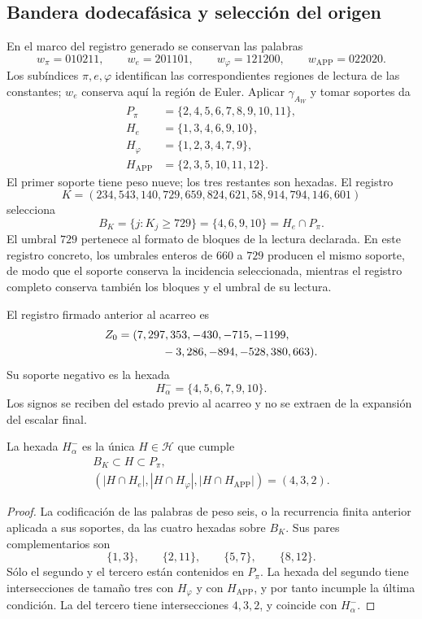 \subsection{Bandera dodecafásica y selección del origen}
\label{subsec:lf-flag}

En el marco del registro generado se conservan las palabras
\[
 w_\pi=010211,\qquad
 w_e=201101,\qquad
 w_\varphi=121200,\qquad
 w_{\mathrm{APP}}=022020.
\]
Los subíndices \(\pi,e,\varphi\) identifican las correspondientes
regiones de lectura de las constantes; \(w_e\) conserva aquí
la región de Euler. Aplicar \(\gamma_{A_W}\) y tomar soportes da
\[
\begin{aligned}
 P_\pi&=\{2,4,5,6,7,8,9,10,11\},\\
 H_e&=\{1,3,4,6,9,10\},\\
 H_\varphi&=\{1,2,3,4,7,9\},\\
 H_{\mathrm{APP}}&=\{2,3,5,10,11,12\}.
\end{aligned}
\]
El primer soporte tiene peso nueve; los tres restantes son
hexadas. El registro
\[
 K=(234,543,140,729,659,824,621,58,914,794,146,601)
\]
selecciona
\[
 B_K=\{j:K_j\geq729\}=\{4,6,9,10\}=H_e\cap P_\pi.
\]
El umbral \(729\) pertenece al formato de bloques de la
lectura declarada. En este registro concreto, los umbrales
enteros de \(660\) a \(729\) producen el mismo soporte, de
modo que el soporte conserva la incidencia seleccionada,
mientras el registro completo conserva también los bloques
y el umbral de su lectura.

El registro firmado anterior al acarreo es
\[
\begin{split}
 Z_0={}&(7,297,353,-430,-715,-1199,\\
       &\hspace{9mm}-3,286,-894,-528,380,663).
\end{split}
\]
Su soporte negativo es la hexada
\[
 H_\alpha^-=\{4,5,6,7,9,10\}.
\]
Los signos se reciben del estado previo al acarreo y no se
extraen de la expansión del escalar final.

\begin{proposition}
\label{prop:lf-flag}
La hexada \(H_\alpha^-\) es la única \(H\in\mathcal H\) que cumple
\[
\begin{gathered}
 B_K\subset H\subset P_\pi,\\
 (|H\cap H_e|,|H\cap H_\varphi|,
                   |H\cap H_{\mathrm{APP}}|)=(4,3,2).
\end{gathered}
\]
\end{proposition}
\begin{proof}
La codificación de las palabras de peso seis, o la recurrencia
finita anterior aplicada a sus soportes, da las cuatro
hexadas sobre \(B_K\). Sus pares complementarios son
\[
 \{1,3\},\qquad\{2,11\},\qquad\{5,7\},\qquad\{8,12\}.
\]
Sólo el segundo y el tercero están contenidos en \(P_\pi\).
La hexada del segundo tiene intersecciones de tamaño tres
con \(H_\varphi\) y con \(H_{\mathrm{APP}}\), y por tanto
incumple la última condición. La del tercero tiene
intersecciones \(4,3,2\), y coincide con \(H_\alpha^-\).
\end{proof}

